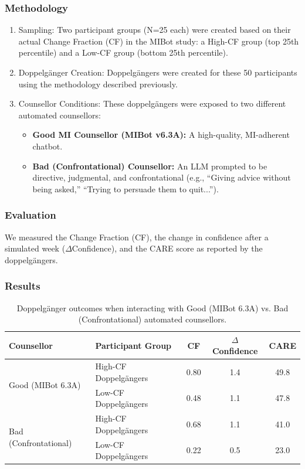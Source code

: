 \subsubsection{Methodology}

\begin{enumerate}
    \item Sampling: Two participant groups (N=25 each) were created based on their actual Change Fraction (CF) in the MIBot study: a High-CF group (top 25th percentile) and a Low-CF group (bottom 25th percentile).

    \item Doppelgänger Creation: Doppelgängers were created for these 50 participants using the methodology described previously.
    
    \item Counsellor Conditions: These doppelgängers were exposed to two different automated counsellors:
    \begin{itemize}
        \item \textbf{Good MI Counsellor (MIBot v6.3A):} A high-quality, MI-adherent chatbot.
        
        \item \textbf{Bad (Confrontational) Counsellor:} An LLM prompted to be directive, judgmental, and confrontational (e.g., ``Giving advice without being asked,'' ``Trying to persuade them to quit...'').
    \end{itemize}
\end{enumerate}

\subsubsection{Evaluation}
We measured the Change Fraction (CF), the change in confidence after a simulated week ($\Delta$Confidence), and the CARE score as reported by the doppelgängers.

\subsubsection{Results}

\begin{table}[ht!]
\centering

\begin{tabular}{@{}llccc@{}}
\toprule
\textbf{Counsellor} & \textbf{Participant Group} & \textbf{CF} & \textbf{$\Delta$Confidence} & \textbf{CARE} \\ \midrule
\multirow{2}{*}{Good (MIBot 6.3A)} & High-CF Doppelgängers & 0.80 & 1.4 & 49.8 \\
& Low-CF Doppelgängers & 0.48 & 1.1 & 47.8 \\ \midrule
\multirow{2}{*}{Bad (Confrontational)} & High-CF Doppelgängers & 0.68 & 1.1 & 41.0 \\
& Low-CF Doppelgängers & 0.22 & 0.5 & 23.0 \\ \bottomrule
\end{tabular}
\caption{Doppelgänger outcomes when interacting with Good (MIBot 6.3A) vs. Bad (Confrontational) automated counsellors.}
\label{tab:good-vs-bad-counselling}
\end{table}

